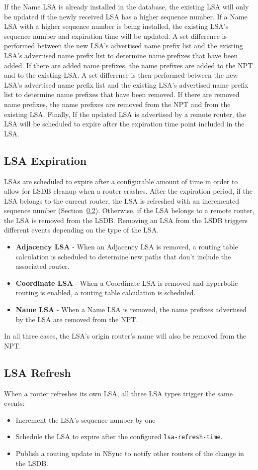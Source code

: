 If the Name LSA is already installed in the database, the existing LSA will only be updated if the newly received LSA has a higher sequence number.
If a Name LSA with a higher sequence number is being installed, the existing LSA's sequence number and expiration time will be updated.
A set difference is performed between the new LSA's advertised name prefix list and the existing LSA's advertised name prefix list to determine name prefixes that have been added.
If there are added name prefixes, the name prefixes are added to the NPT and to the existing LSA.
A set difference is then performed between the new LSA's advertised name prefix list and the existing LSA's advertised name prefix list to determine name prefixes that have been removed.
If there are removed name prefixes, the name prefixes are removed from the NPT and from the existing LSA.
Finally, If the updated LSA is advertised by a remote router, the LSA will be scheduled to expire after the expiration time point included in the LSA.

\subsection{LSA Expiration}

LSAs are scheduled to expire after a configurable amount of time in order to allow for LSDB cleanup when a router crashes.
After the expiration period, if the LSA belongs to the current router, the LSA is refreshed with an incremented sequence number (Section~\ref{sec:lsa-refresh}).
Otherwise, if the LSA belongs to a remote router, the LSA is removed from the LSDB.
Removing an LSA from the LSDB triggers different events depending on the type of the LSA.
\begin{itemize}
\item \textbf{Adjacency LSA} - When an Adjacency LSA is removed, a routing table calculation is scheduled to determine new paths that don't include the associated router.
\item \textbf{Coordinate LSA} - When a Coordinate LSA is removed and hyperbolic routing is enabled, a routing table calculation is scheduled.
\item \textbf{Name LSA} - When a Name LSA is removed, the name prefixes advertised by the LSA are removed from the NPT.
\end{itemize}

In all three cases, the LSA's origin router's name will also be removed from the NPT.

\subsection{LSA Refresh}
\label{sec:lsa-refresh}

When a router refreshes its own LSA, all three LSA types trigger the same events:
\begin{itemize}
\item Increment the LSA's sequence number by one
\item Schedule the LSA to expire after the configured \texttt{lsa-refresh-time}.
\item Publish a routing update in NSync to notify other routers of the change in the LSDB.
\end{itemize}


